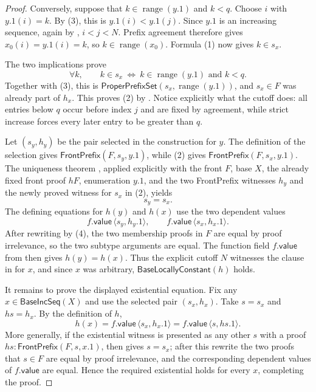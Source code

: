\begin{proof}
Conversely, suppose that
\(k\in\operatorname{range}(y.1)\) and $k<q$.  Choose $i$ with
$y.1(i)=k$.  By (3), this is $y.1(i)<y.1(j)$.  Since $y.1$ is an
increasing sequence, again by , $i<j<N$.  Prefix agreement
therefore gives $x_0(i)=y.1(i)=k$, so
$k\in\operatorname{range}(x_0)$.  Formula (1) now gives $k\in s_x$.

The two implications prove
\[
  \forall k,\qquad k\in s_x\ \Longleftrightarrow\ k\in\operatorname{range}(y.1)
  \text{ and } k<q.
\]
Together with (3), this is
\(\mathsf{ProperPrefixSet}(s_x,\operatorname{range}(y.1))\), and
$s_x\in F$ was already part of $h_x$.  This proves (2) by
.  Notice explicitly what the cutoff does: all entries
below $q$ occur before index $j$ and are fixed by agreement, while strict
increase forces every later entry to be greater than $q$.

Let $(s_y,h_y)$ be the pair selected in the construction for $y$.  The
definition of the selection gives
\(\mathsf{FrontPrefix}(F,s_y,y.1)\), while (2) gives
\(\mathsf{FrontPrefix}(F,s_x,y.1)\).  The uniqueness theorem
, applied explicitly with the front $F$, base
$X$, the already fixed front proof $hF$, enumeration $y.1$, and the two
FrontPrefix witnesses $h_y$ and the newly proved witness for $s_x$ in (2),
yields
\[
  s_y=s_x.                                                  \tag{4}
\]
The defining equations for $h(y)$ and $h(x)$ use the two dependent values
\[
  f.\mathsf{value}\,\langle s_y,h_y.1\rangle,
  \qquad
  f.\mathsf{value}\,\langle s_x,h_x.1\rangle.
\]
After rewriting by (4), the two membership proofs in $F$ are equal by
proof irrelevance, so the two subtype arguments are equal.  The function
field $f.\mathsf{value}$ from  then gives
\(h(y)=h(x)\).  Thus the explicit cutoff $N$ witnesses the clause in
 for $x$, and since $x$ was arbitrary,
$\mathsf{BaseLocallyConstant}(h)$ holds.

It remains to prove the displayed existential equation.  Fix any
$x\in\mathsf{BaseIncSeq}(X)$ and use the selected pair $(s_x,h_x)$.
Take $s=s_x$ and $hs=h_x$.  By the definition of $h$,
\[
  h(x)=f.\mathsf{value}\,\langle s_x,h_x.1\rangle
       =f.\mathsf{value}\,\langle s,hs.1\rangle.
\]
More generally, if the existential witness is presented as any other
$s$ with a proof $hs:\mathsf{FrontPrefix}(F,s,x.1)$, then
 gives $s=s_x$; after this rewrite the two proofs
that $s\in F$ are equal by proof irrelevance, and the corresponding
dependent values of $f.\mathsf{value}$ are equal.  Hence the required
existential holds for every $x$, completing the proof.
\end{proof}
